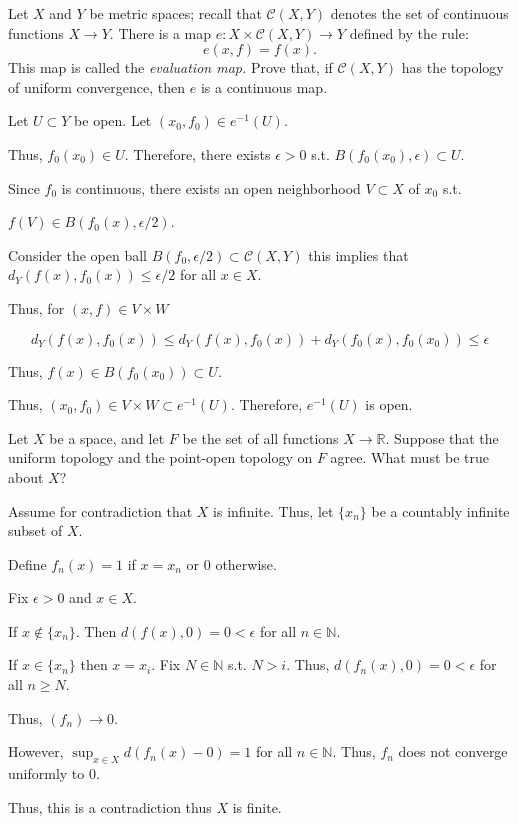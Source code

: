 \documentclass[12pt, letterpaper]{article}
\newcommand{\R}{\mathbb{R}}
\newcommand{\N}{\mathbb{N}}
\begin{document}
\newcommand{\mc}[1]{\mathcal{#1}}
\begin{problem}{}
    Let $X$ and $Y$ be metric spaces; recall that $\mc{C}(X, Y)$ denotes
  the set of continuous functions $X \to Y$. There is a map
  $e:X \times \mc{C}(X, Y) \to Y$ defined by the rule:
  \[
    e(x, f) = f(x).
  \]
  This map is called the \emph{evaluation map.} Prove that, if
  $\mc{C}(X, Y)$ has the topology of uniform convergence, then $e$ is
  a continuous map.
\end{problem}
\begin{problemproof}
    Let $U \subset Y$ be open. Let $(x_0,f_0) \in e^{-1}(U)$.

    Thus, $f_0(x_0) \in U$. Therefore, there exists $\epsilon > 0$ s.t. $B(f_0(x_0), \epsilon) \subset U$.

    Since $f_0$ is continuous, there exists an open neighborhood $V \subset X$ of $x_0$ s.t. 

    $f(V) \in B(f_0(x),\epsilon/2)$.

    Consider the open ball $B(f_0,\epsilon/2) \subset \mathcal{C}(X,Y)$ this implies that $d_Y(f(x),f_0(x)) \leq \epsilon / 2$ for all $x \in X$.

    Thus, for $(x,f) \in V \times W$

    \[d_Y(f(x),f_0(x)) \leq d_Y(f(x),f_0(x)) + d_Y(f_0(x),f_0(x_0)) \leq \epsilon\]

    Thus, $f(x) \in B(f_0(x_0)) \subset U$.

    Thus, $(x_0,f_0) \in V \times W \subset e^{-1}(U)$. Therefore, $e^{-1}(U)$ is open.
\end{problemproof}

\begin{problem}{}
    Let $X$ be a space, and let $F$ be the set of all functions
  $X \to \R$. Suppose that the uniform topology and the point-open
  topology on $F$ agree. What must be true about $X$?
\end{problem}
\begin{problemproof}
    Assume for contradiction that $X$ is infinite. Thus, let $\{x_n\}$ be a countably infinite subset of $X$.

    Define $f_n(x)=1$ if $x=x_n$ or $0$ otherwise.

    Fix $\epsilon >0$ and $x \in X$.

    If $x \notin \{x_n\}$. Then $d(f(x),0)=0 < \epsilon$ for all $n \in \N$.

    If $x \in \{x_n\}$ then $x=x_i$. Fix $N \in \N$ s.t. $N > i$. Thus, $d(f_n(x),0)=0 < \epsilon$ for all $n \geq N$.

    Thus, $(f_n) \to 0$.

    However, $\sup_{x \in X}d(f_n(x)-0)=1$ for all $n \in \N$. Thus, $f_n$ does not converge uniformly to $0$.

    Thus, this is a contradiction thus $X$ is finite.
\end{problemproof}
\end{document}
